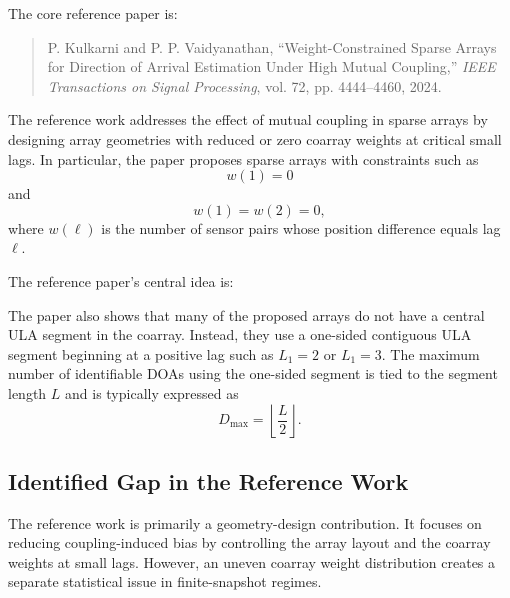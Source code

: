 \documentclass[11pt,letterpaper]{article}
\begin{document}
The core reference paper is:

\begin{quote}
P. Kulkarni and P. P. Vaidyanathan, ``Weight-Constrained Sparse Arrays for Direction of Arrival Estimation Under High Mutual Coupling,'' \emph{IEEE Transactions on Signal Processing}, vol. 72, pp. 4444--4460, 2024.
\end{quote}

The reference work addresses the effect of mutual coupling in sparse arrays by designing array geometries with reduced or zero coarray weights at critical small lags. In particular, the paper proposes sparse arrays with constraints such as
\begin{equation}
    w(1)=0
\end{equation}
and
\begin{equation}
    w(1)=w(2)=0,
\end{equation}
where $w(\ell)$ is the number of sensor pairs whose position difference equals lag $\ell$.

The reference paper's central idea is:

\begin{center}
\end{center}

The paper also shows that many of the proposed arrays do not have a central ULA segment in the coarray. Instead, they use a one-sided contiguous ULA segment beginning at a positive lag such as $L_1=2$ or $L_1=3$. The maximum number of identifiable DOAs using the one-sided segment is tied to the segment length $L$ and is typically expressed as
\begin{equation}
    D_{\max} = \left\lfloor \frac{L}{2} \right\rfloor .
\end{equation}

\subsection{Identified Gap in the Reference Work}

The reference work is primarily a geometry-design contribution. It focuses on reducing coupling-induced bias by controlling the array layout and the coarray weights at small lags. However, an uneven coarray weight distribution creates a separate statistical issue in finite-snapshot regimes.
\end{document}
